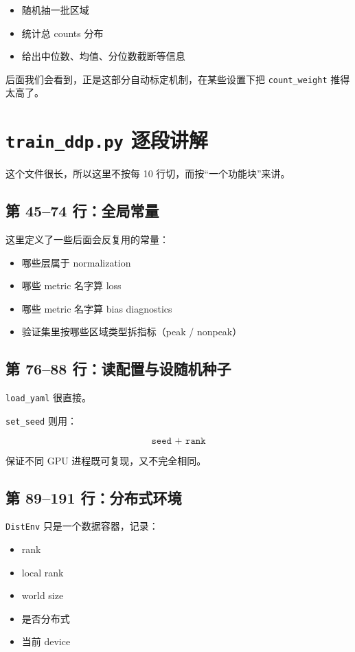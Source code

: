 \documentclass[11pt,a4paper]{ctexart}
\begin{document}
\begin{itemize}[leftmargin=2em]
\item 随机抽一批区域
\item 统计总 counts 分布
\item 给出中位数、均值、分位数截断等信息
\end{itemize}

后面我们会看到，正是这部分自动标定机制，在某些设置下把
\texttt{count\_weight} 推得太高了。

\section{\texttt{train\_ddp.py} 逐段讲解}

这个文件很长，所以这里不按每 10 行切，而按“一个功能块”来讲。

\subsection{第 45--74 行：全局常量}

这里定义了一些后面会反复用的常量：

\begin{itemize}[leftmargin=2em]
\item 哪些层属于 normalization
\item 哪些 metric 名字算 loss
\item 哪些 metric 名字算 bias diagnostics
\item 验证集里按哪些区域类型拆指标（peak / nonpeak）
\end{itemize}

\subsection{第 76--88 行：读配置与设随机种子}

\texttt{load\_yaml} 很直接。

\texttt{set\_seed} 则用：

\[
\texttt{seed + rank}
\]

保证不同 GPU 进程既可复现，又不完全相同。

\subsection{第 89--191 行：分布式环境}

\texttt{DistEnv} 只是一个数据容器，记录：

\begin{itemize}[leftmargin=2em]
\item rank
\item local rank
\item world size
\item 是否分布式
\item 当前 device
\end{itemize}
\end{document}
